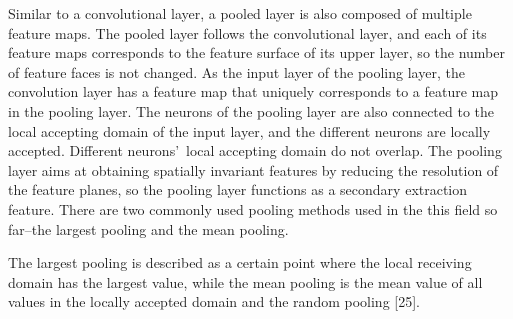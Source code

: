 \documentclass[journal]{IEEEtran}
\begin{document}
Similar to a convolutional layer, a pooled layer is also composed of multiple feature maps. The pooled layer follows the convolutional layer, and each of its feature maps corresponds to the feature surface of its upper layer, so the number of feature faces is not changed. As the input layer of the pooling layer, the convolution layer has a feature map that uniquely corresponds to a feature map in the pooling layer. The neurons of the pooling layer are also connected to the local accepting domain of the input layer, and the different neurons are locally accepted. Different neurons' local accepting domain do not overlap. The pooling layer aims at obtaining spatially invariant features by reducing the resolution of the feature planes, so the pooling layer functions as a secondary extraction feature. There are two commonly used pooling methods used in the this field so far--the largest pooling and the mean pooling.

The largest pooling is described as a certain point where the local receiving domain has the largest value, while the mean pooling is the mean value of all values in the locally accepted domain and the random pooling [25].
\end{document}
